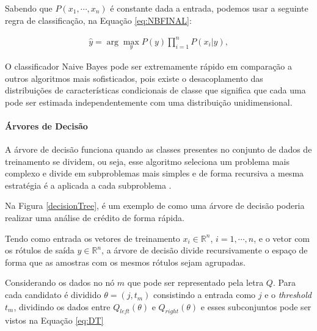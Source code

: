        Sabendo que $P(x_{1},\cdots, x_{n})$ é constante dada a entrada, podemos usar a seguinte regra de classificação, na Equação \ref{eq:NBFINAL}:
        
        \begin{equation}\label{eq:NBFINAL}
          \begin{aligned}
            \widehat{y} = \arg\max_{y} P(y)\prod_{i=1}^{n}P(x_{i}|y),
        \end{aligned}
        \end{equation}


        O classificador Naive Bayes pode ser extremamente rápido em comparação a outros algoritmos mais sofisticados, pois existe o desacoplamento
        das distribuições de características condicionais de classe que significa que cada uma pode ser estimada independentemente com uma distribuição unidimensional\cite{zhang2004optimality}.


        \paragraph{Árvores de Decisão}

          A árvore de decisão funciona quando as classes presentes no conjunto de dados de treinamento se dividem, ou seja, esse algoritmo seleciona
          um problema mais complexo e divide em subproblemas mais simples e de forma recursiva a mesma estratégia é a aplicada a cada subproblema \cite{coelhoanalise}.


          Na Figura \ref{decisionTree}, é um exemplo de como uma árvore de decisão poderia realizar uma análise de crédito de forma rápida. 




          Tendo como entrada os vetores de treinamento $x_{i} \in \mathbb{R}^{n}$, $i=1,\cdots, n$, e o vetor com os rótulos de saída $y \in \mathbb{R}^{n}$,
          a árvore de decisão divide recursivamente o espaço de forma que as amostras com os mesmos rótulos sejam agrupadas\cite{breiman2017classification}.

          Considerando os dados no nó $m$ que pode ser representado pela letra $Q$. Para cada candidato é dividido $\theta = (j,t_{m})$ consistindo 
          a entrada como $j$ e o \textit{threshold} $t_{m}$, dividindo os dados entre $Q_{left}(\theta)$ e $Q_{right}(\theta)$ e esses subconjuntos pode ser vistos na
          Equação \ref{eq:DT}


